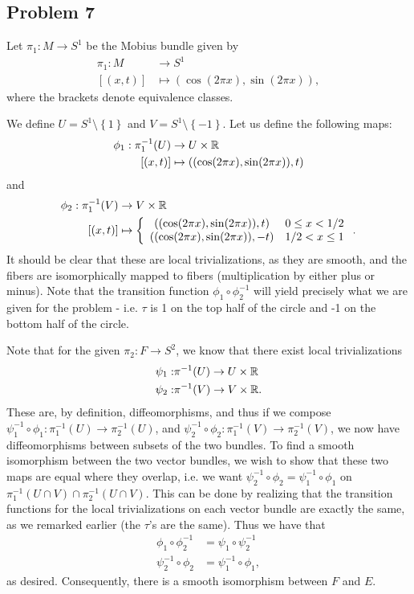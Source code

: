 \documentclass{../../mathnotes}
\begin{document}
\subsection*{Problem 7}

Let $\pi_1:M\to S^1$ be the Mobius bundle given by
\begin{align*}
    \pi_1: M &\to S^1\\
    [(x,t)]&\mapsto \left( \cos(2\pi x),\sin(2\pi x) \right),
\end{align*}
where the brackets denote equivalence classes.

We define $U=S^1\setminus\left\{ 1 \right\}$ and $V=S^1\setminus\left\{ -1 \right\}$.
Let us define the following maps:
\begin{align*}
    \phi_1: \pi_1^{-1}(U)&\to U\times \mathbb{R}\\
    [(x,t)]&\mapsto \left( (\cos(2\pi x), \sin(2\pi x)), t \right)
\end{align*}
and
\begin{align*}
    \phi_2: \pi_1^{-1}(V)&\to V\times \R\\
    [(x,t)]&\mapsto
    \left\{ 
        \begin{array}[]{cc}
            ( (\cos(2\pi x),\sin(2\pi x)), t) & 0\leq x < 1/2\\
            ( (\cos(2\pi x),\sin(2\pi x)), -t) & 1/2< x \leq 1\\
        \end{array}
        \right..
\end{align*}
It should be clear that these are local trivializations, as they are smooth, and the fibers are
isomorphically mapped to fibers (multiplication by either plus or minus).
Note that the transition function $\phi_1\circ \phi_2^{-1}$ will yield precisely what we are given
for the problem - i.e. $\tau$ is 1 on the top half of the circle and -1 on the bottom half of the
circle.

Note that for the given $\pi_2:F\to S^2$, we know that there exist local trivializations 
\begin{align*}
    \psi_1: & \pi^{-1}(U)\to U\times \mathbb{R}\\
    \psi_2: & \pi^{-1}(V)\to V\times \mathbb{R}.
\end{align*}
These are, by definition, diffeomorphisms, and thus if we compose $\psi_1^{-1}\circ\phi_1:\pi_1^{-1}(U)\to\pi_2^{-1}(U)$,
and $\psi_2^{-1}\circ\phi_2:\pi_1^{-1}(V)\to\pi_2^{-1}(V)$, we now have diffeomorphisms between subsets of the two bundles.
To find a smooth isomorphism between the two vector bundles, we wish to show that these two maps are equal where they overlap,
i.e. we want $\psi_2^{-1}\circ\phi_2=\psi_1^{-1}\circ\phi_1$ on $\pi_1^{-1}(U\cap V)\cap\pi_2^{-1}(U\cap V)$.
This can be done by realizing that the transition functions for the local trivializations on each vector bundle
are exactly the same, as we remarked earlier (the $\tau$'s are the same). Thus we have that
\begin{align*}
    \phi_1\circ\phi_2^{-1}&=\psi_1\circ\psi_2^{-1}\\
    \psi_2^{-1}\circ\phi_2&=\psi_1^{-1}\circ\phi_1,
\end{align*}
as desired. Consequently, there is a smooth isomorphism between $F$ and $E$.
\end{document}
